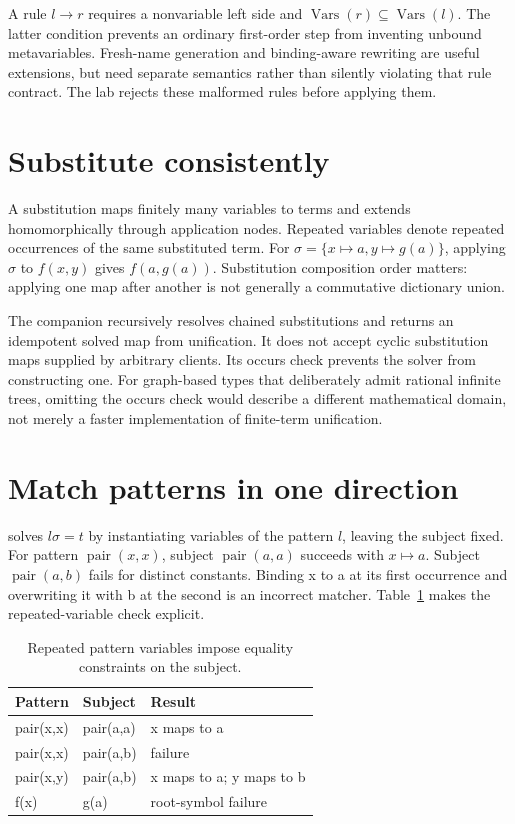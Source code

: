 A rule $l\to r$ requires a nonvariable left side and $\operatorname{Vars}(r)\subseteq\operatorname{Vars}(l)$.
The latter condition prevents an ordinary first-order step from inventing unbound metavariables.
Fresh-name generation and binding-aware rewriting are useful extensions, but need separate semantics rather than silently violating that rule contract.
The lab rejects these malformed rules before applying them.

\section{Substitute consistently}
\label{sec:ch82-substitution}
A substitution maps finitely many variables to terms and extends homomorphically through application nodes.
Repeated variables denote repeated occurrences of the same substituted term.
For $\sigma=\{x\mapsto a,y\mapsto g(a)\}$, applying $\sigma$ to $f(x,y)$ gives $f(a,g(a))$.
Substitution composition order matters: applying one map after another is not generally a commutative dictionary union.

The companion recursively resolves chained substitutions and returns an idempotent solved map from unification.
It does not accept cyclic substitution maps supplied by arbitrary clients.
Its occurs check prevents the solver from constructing one.
For graph-based types that deliberately admit rational infinite trees, omitting the occurs check would describe a different mathematical domain, not merely a faster implementation of finite-term unification.

\section{Match patterns in one direction}
\label{sec:ch82-match}
 solves $l\sigma=t$ by instantiating variables of the pattern $l$, leaving the subject fixed.
For pattern $\operatorname{pair}(x,x)$, subject $\operatorname{pair}(a,a)$ succeeds with $x\mapsto a$.
Subject $\operatorname{pair}(a,b)$ fails for distinct constants.
Binding x to a at its first occurrence and overwriting it with b at the second is an incorrect matcher.
Table~\ref{tab:ch82-match} makes the repeated-variable check explicit.

\begin{table}[htbp]
\caption{Repeated pattern variables impose equality constraints on the subject.}
\label{tab:ch82-match}
\centering
\begin{tabular}{lll}
\toprule
Pattern & Subject & Result \\
\midrule
pair(x,x) & pair(a,a) & x maps to a \\
pair(x,x) & pair(a,b) & failure \\
pair(x,y) & pair(a,b) & x maps to a; y maps to b \\
f(x) & g(a) & root-symbol failure \\
\bottomrule
\end{tabular}
\end{table}

